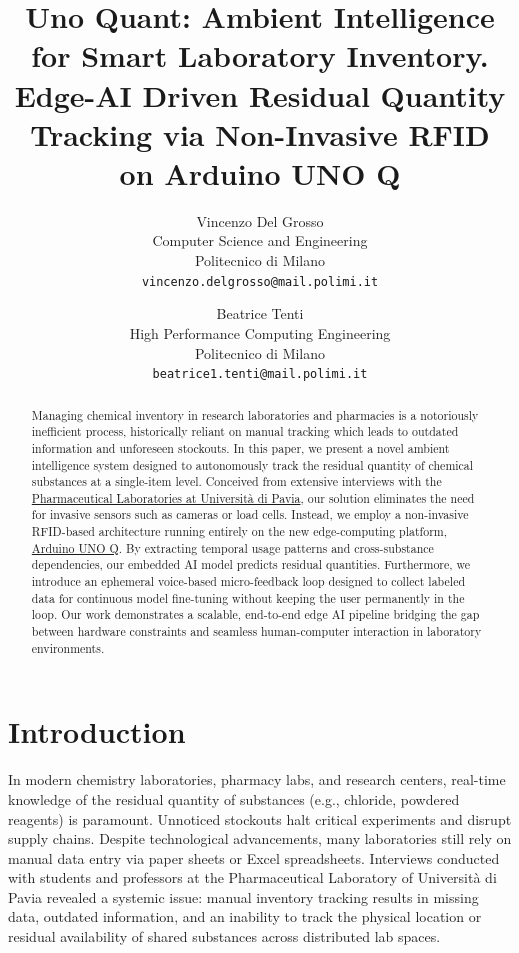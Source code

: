\documentclass[10pt,twocolumn,letterpaper]{article}
\title{Uno Quant: Ambient Intelligence for Smart Laboratory Inventory.\\ Edge-AI Driven Residual Quantity Tracking via Non-Invasive RFID on Arduino UNO Q}
\author{
Vincenzo Del Grosso\\
Computer Science and Engineering\\
Politecnico di Milano\\
{\tt\small vincenzo.delgrosso@mail.polimi.it}
\and
Beatrice Tenti\\
High Performance Computing Engineering\\
Politecnico di Milano\\
{\tt\small beatrice1.tenti@mail.polimi.it}
}
\begin{document}
\maketitle

\begin{abstract}
Managing chemical inventory in research laboratories and pharmacies is a notoriously inefficient process, historically reliant on manual tracking which leads to outdated information and unforeseen stockouts. In this paper, we present a novel ambient intelligence system designed to autonomously track the residual quantity of chemical substances at a single-item level. Conceived from extensive interviews with the \href{https://scienzedelfarmaco.dip.unipv.it/en}{Pharmaceutical Laboratories at Università di Pavia}, our solution eliminates the need for invasive sensors such as cameras or load cells. Instead, we employ a non-invasive RFID-based architecture running entirely on the new edge-computing platform, \href{https://www.arduino.cc/product-uno-q}{Arduino UNO Q}. By extracting temporal usage patterns and cross-substance dependencies, our embedded AI model predicts residual quantities. Furthermore, we introduce an ephemeral voice-based micro-feedback loop designed to collect labeled data for continuous model fine-tuning without keeping the user permanently in the loop. Our work demonstrates a scalable, end-to-end edge AI pipeline bridging the gap between hardware constraints and seamless human-computer interaction in laboratory environments.
\end{abstract}

\section{Introduction}

In modern chemistry laboratories, pharmacy labs, and research centers, real-time knowledge of the residual quantity of substances (e.g., chloride, powdered reagents) is paramount. Unnoticed stockouts halt critical experiments and disrupt supply chains. Despite technological advancements, many laboratories still rely on manual data entry via paper sheets or Excel spreadsheets. Interviews conducted with students and professors at the Pharmaceutical Laboratory of Università di Pavia revealed a systemic issue: manual inventory tracking results in missing data, outdated information, and an inability to track the physical location or residual availability of shared substances across distributed lab spaces. 
\end{document}
